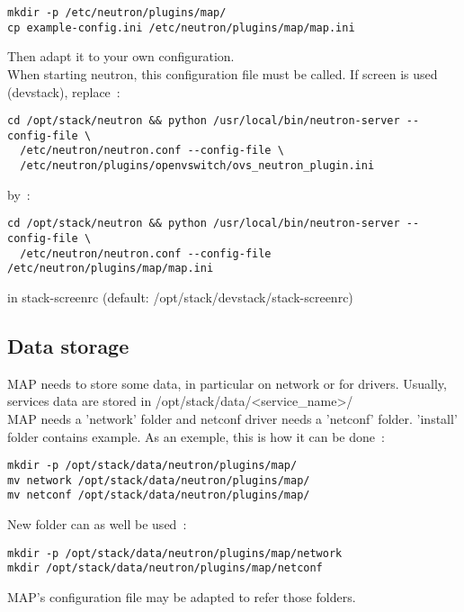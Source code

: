 \begin{verbatim}
mkdir -p /etc/neutron/plugins/map/
cp example-config.ini /etc/neutron/plugins/map/map.ini
\end{verbatim}
Then adapt it to your own configuration.\\
When starting neutron, this configuration file must be called. If screen is
used (devstack), replace~:
\begin{verbatim}
cd /opt/stack/neutron && python /usr/local/bin/neutron-server --config-file \
  /etc/neutron/neutron.conf --config-file \
  /etc/neutron/plugins/openvswitch/ovs_neutron_plugin.ini
\end{verbatim}
by~:
\begin{verbatim}
cd /opt/stack/neutron && python /usr/local/bin/neutron-server --config-file \
  /etc/neutron/neutron.conf --config-file /etc/neutron/plugins/map/map.ini
\end{verbatim}
in stack-screenrc (default: /opt/stack/devstack/stack-screenrc)

\subsection{Data storage}
MAP needs to store some data, in particular on network or for drivers. Usually,
services data are stored in /opt/stack/data/\textless service\_name\textgreater / \\
MAP needs a 'network' folder and netconf driver needs a 'netconf' folder.
'install' folder contains example. As an exemple, this is how it can be done~:
\begin{verbatim}
mkdir -p /opt/stack/data/neutron/plugins/map/
mv network /opt/stack/data/neutron/plugins/map/
mv netconf /opt/stack/data/neutron/plugins/map/
\end{verbatim}
New folder can as well be used~:
\begin{verbatim}
mkdir -p /opt/stack/data/neutron/plugins/map/network
mkdir /opt/stack/data/neutron/plugins/map/netconf
\end{verbatim}
MAP's configuration file may be adapted to refer those folders.


